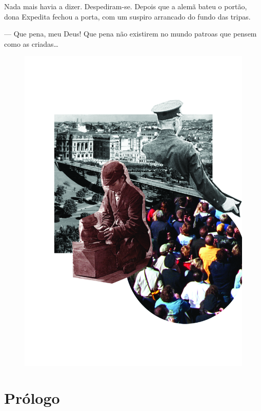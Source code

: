 Nada mais havia a dizer. Despediram-se. Depois que a alemã bateu o
portão, dona Expedita fechou a porta, com um suspiro arrancado do fundo
das tripas.

--- Que pena, meu Deus! Que pena não existirem no mundo patroas que
pensem como as criadas\ldots{}

\blankpage

\pagebreak
\thispagestyle{empty}
\begin{figure}
\includegraphics[width=\textwidth]{./ilustracoes/06_FISCO.jpg}
\end{figure}
\pagebreak


\section{Prólogo}


